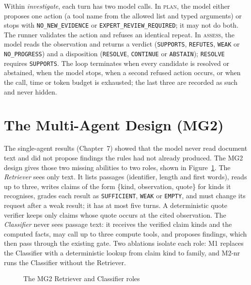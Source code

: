 Within \emph{investigate}, each turn has two model calls. In \textsc{plan}, the model either
proposes one action (a tool name from the allowed list and typed arguments) or stops with
\texttt{NO\_NEW\_EVIDENCE} or \texttt{EXPERT\_REVIEW\_REQUIRED}; it may not do both. The runner
validates the action and refuses an identical repeat. In \textsc{assess}, the model reads the
observation and returns a verdict (\texttt{SUPPORTS}, \texttt{REFUTES}, \texttt{WEAK} or
\texttt{NO\_PROGRESS}) and a disposition (\texttt{RESOLVE}, \texttt{CONTINUE} or \texttt{ABSTAIN});
\texttt{RESOLVE} requires \texttt{SUPPORTS}. The loop terminates when every candidate is resolved
or abstained, when the model stops, when a second refused action occurs, or when the call, time or
token budget is exhausted; the last three are recorded as such and never hidden.

\section{The Multi-Agent Design (MG2)}
The single-agent results (Chapter~7) showed that the model never read document text and did not
propose findings the rules had not already produced. The MG2 design gives those two missing
abilities to two roles, shown in Figure~\ref{fig:mg2}. The \emph{Retriever} sees only text. It
lists passages (identifier, length and first words), reads up to three, writes claims of the form
\{kind, observation, quote\} for kinds it recognises, grades each result as \texttt{SUFFICIENT},
\texttt{WEAK} or \texttt{EMPTY}, and must change its request after a weak result; it has at most
five turns. A deterministic quote verifier keeps only claims whose quote occurs at the cited
observation. The \emph{Classifier} never sees passage text: it receives the verified claim kinds
and the computed facts, may call up to three compute tools, and proposes findings, which then pass
through the existing gate. Two ablations isolate each role: M1 replaces the Classifier with a
deterministic lookup from claim kind to family, and M2-nr runs the Classifier without the
Retriever.

\begin{figure}[htbp]
\centering
\resizebox{0.95\linewidth}{!}{}
\caption{The MG2 Retriever and Classifier roles}
\label{fig:mg2}
\end{figure}

